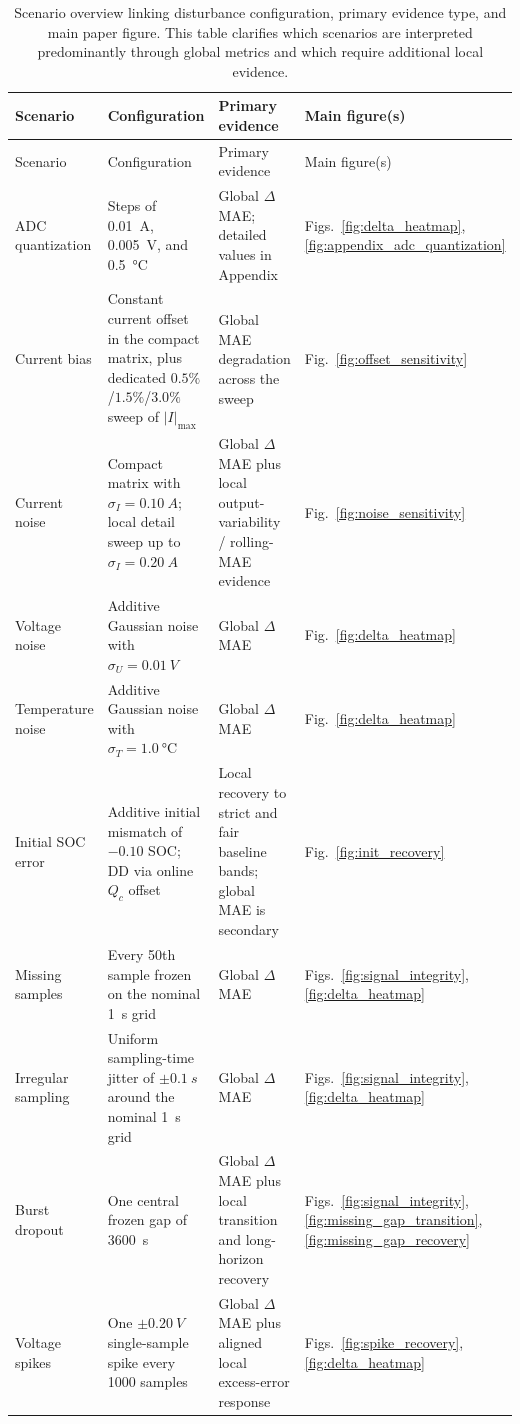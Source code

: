 \documentclass[review,nopreprintline]{elsarticle}
\begin{document}
\small
\begin{longtable}{p{2.3cm}p{3.0cm}p{4.0cm}p{1.7cm}}
\caption{Scenario overview linking disturbance configuration, primary evidence type, and main paper figure. This table clarifies which scenarios are interpreted predominantly through global metrics and which require additional local evidence.}\label{tab:appendix_scenario_overview}\\
\toprule
Scenario & Configuration & Primary evidence & Main figure(s) \\
\midrule
\endfirsthead
\toprule
Scenario & Configuration & Primary evidence & Main figure(s) \\
\midrule
\endhead
ADC quantization & Steps of \SI{0.01}{A}, \SI{0.005}{V}, and \SI{0.5}{\celsius} & Global $\Delta$MAE; detailed values in Appendix & Figs.~\ref{fig:delta_heatmap}, \ref{fig:appendix_adc_quantization} \\
Current bias & Constant current offset in the compact matrix, plus dedicated $0.5\%$/$1.5\%$/$3.0\%$ sweep of $|I|_{\max}$ & Global MAE degradation across the sweep & Fig.~\ref{fig:offset_sensitivity} \\
Current noise & Compact matrix with $\sigma_I=\SI{0.10}{A}$; local detail sweep up to $\sigma_I=\SI{0.20}{A}$ & Global $\Delta$MAE plus local output-variability / rolling-MAE evidence & Fig.~\ref{fig:noise_sensitivity} \\
Voltage noise & Additive Gaussian noise with $\sigma_U=\SI{0.01}{V}$ & Global $\Delta$MAE & Fig.~\ref{fig:delta_heatmap} \\
Temperature noise & Additive Gaussian noise with $\sigma_T=\SI{1.0}{\celsius}$ & Global $\Delta$MAE & Fig.~\ref{fig:delta_heatmap} \\
Initial SOC error & Additive initial mismatch of $-0.10$ SOC; DD via online $Q_c$ offset & Local recovery to strict and fair baseline bands; global MAE is secondary & Fig.~\ref{fig:init_recovery} \\
Missing samples & Every 50th sample frozen on the nominal \SI{1}{s} grid & Global $\Delta$MAE & Figs.~\ref{fig:signal_integrity}, \ref{fig:delta_heatmap} \\
Irregular sampling & Uniform sampling-time jitter of $\pm\SI{0.1}{s}$ around the nominal \SI{1}{s} grid & Global $\Delta$MAE & Figs.~\ref{fig:signal_integrity}, \ref{fig:delta_heatmap} \\
Burst dropout & One central frozen gap of \SI{3600}{s} & Global $\Delta$MAE plus local transition and long-horizon recovery & Figs.~\ref{fig:signal_integrity}, \ref{fig:missing_gap_transition}, \ref{fig:missing_gap_recovery} \\
Voltage spikes & One $\pm\SI{0.20}{V}$ single-sample spike every 1000 samples & Global $\Delta$MAE plus aligned local excess-error response & Figs.~\ref{fig:spike_recovery}, \ref{fig:delta_heatmap} \\
\bottomrule
\end{longtable}
\normalsize
\end{document}
